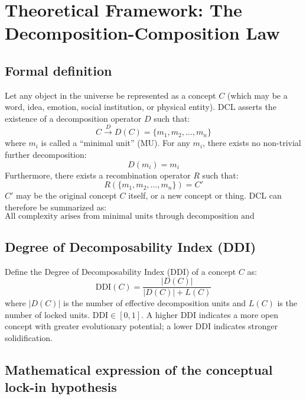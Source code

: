 \documentclass[11pt,a4paper]{article}
\begin{document}
\section{Theoretical Framework: The Decomposition-Composition Law}

\subsection{Formal definition}

Let any object in the universe be represented as a concept $C$ (which may be a word, idea, emotion, social institution, or physical entity). DCL asserts the existence of a decomposition operator $D$ such that:
\begin{equation}
    C \xrightarrow{D} D(C) = \{m_1, m_2, \ldots, m_n\}
    \label{eq:decomp}
\end{equation}
where $m_i$ is called a ``minimal unit'' (MU). For any $m_i$, there exists no non-trivial further decomposition:
\begin{equation}
    D(m_i) = m_i
    \label{eq:minimal}
\end{equation}
Furthermore, there exists a recombination operator $R$ such that:
\begin{equation}
    R(\{m_1, m_2, \ldots, m_n\}) = C'
    \label{eq:recomb}
\end{equation}
$C'$ may be the original concept $C$ itself, or a new concept or thing. DCL can therefore be summarized as:
\begin{equation}
    \text{All complexity arises from minimal units through decomposition and recombination.}
    \label{eq:dcl}
\end{equation}

\subsection{Degree of Decomposability Index (DDI)}

Define the Degree of Decomposability Index (DDI) of a concept $C$ as:
\begin{equation}
    \text{DDI}(C) = \frac{|D(C)|}{|D(C)| + L(C)}
    \label{eq:ddi}
\end{equation}
where $|D(C)|$ is the number of effective decomposition units and $L(C)$ is the number of locked units. $\text{DDI} \in [0,1]$. A higher DDI indicates a more open concept with greater evolutionary potential; a lower DDI indicates stronger solidification.

\subsection{Mathematical expression of the conceptual lock-in hypothesis}
\end{document}
